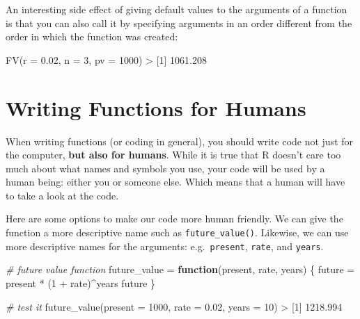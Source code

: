\documentclass[
]{book}
\newenvironment{Shaded}{\begin{snugshade}}{\end{snugshade}}
\newcommand{\AttributeTok}[1]{\textcolor[rgb]{0.77,0.63,0.00}{#1}}
\newcommand{\CommentTok}[1]{\textcolor[rgb]{0.56,0.35,0.01}{\textit{#1}}}
\newcommand{\ControlFlowTok}[1]{\textcolor[rgb]{0.13,0.29,0.53}{\textbf{#1}}}
\newcommand{\DecValTok}[1]{\textcolor[rgb]{0.00,0.00,0.81}{#1}}
\newcommand{\FloatTok}[1]{\textcolor[rgb]{0.00,0.00,0.81}{#1}}
\newcommand{\FunctionTok}[1]{\textcolor[rgb]{0.00,0.00,0.00}{#1}}
\newcommand{\NormalTok}[1]{#1}
\newcommand{\OtherTok}[1]{\textcolor[rgb]{0.56,0.35,0.01}{#1}}
\newcommand{\SpecialCharTok}[1]{\textcolor[rgb]{0.00,0.00,0.00}{#1}}
\begin{document}
An interesting side effect of giving default values to the arguments of
a function is that you can also call it by specifying arguments in an order
different from the order in which the function was created:

\begin{Shaded}
\begin{Highlighting}[]
\FunctionTok{FV}\NormalTok{(}\AttributeTok{r =} \FloatTok{0.02}\NormalTok{, }\AttributeTok{n =} \DecValTok{3}\NormalTok{, }\AttributeTok{pv =} \DecValTok{1000}\NormalTok{)}
\SpecialCharTok{\textgreater{}}\NormalTok{ [}\DecValTok{1}\NormalTok{] }\FloatTok{1061.208}
\end{Highlighting}
\end{Shaded}

\hypertarget{writing-functions-for-humans}{%
\section{Writing Functions for Humans}\label{writing-functions-for-humans}}

When writing functions (or coding in general), you should write code not just
for the computer, \textbf{but also for humans}. While it is true that R doesn't
care too much about what names and symbols you use, your code will be used by
a human being: either you or someone else. Which means that a human will have
to take a look at the code.

Here are some options to make our code more human friendly. We can give the
function a more descriptive name such as \texttt{future\_value()}. Likewise, we can
use more descriptive names for the arguments: e.g.~\texttt{present}, \texttt{rate}, and
\texttt{years}.

\begin{Shaded}
\begin{Highlighting}[]
\CommentTok{\# future value function}
\NormalTok{future\_value }\OtherTok{=} \ControlFlowTok{function}\NormalTok{(present, rate, years) \{}
\NormalTok{  future }\OtherTok{=}\NormalTok{ present }\SpecialCharTok{*}\NormalTok{ (}\DecValTok{1} \SpecialCharTok{+}\NormalTok{ rate)}\SpecialCharTok{\^{}}\NormalTok{years}
\NormalTok{  future}
\NormalTok{\}}

\CommentTok{\# test it}
\FunctionTok{future\_value}\NormalTok{(}\AttributeTok{present =} \DecValTok{1000}\NormalTok{, }\AttributeTok{rate =} \FloatTok{0.02}\NormalTok{, }\AttributeTok{years =} \DecValTok{10}\NormalTok{)}
\SpecialCharTok{\textgreater{}}\NormalTok{ [}\DecValTok{1}\NormalTok{] }\FloatTok{1218.994}
\end{Highlighting}
\end{Shaded}
\end{document}
